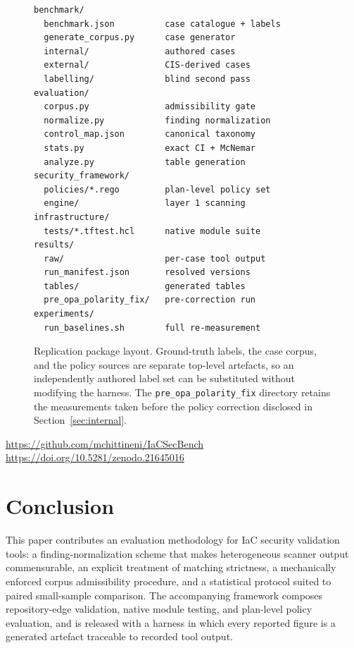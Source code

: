 \documentclass[journal]{IEEEtran}
\begin{document}
\begin{figure}[!t]
\centering
\footnotesize
\begin{verbatim}
benchmark/
  benchmark.json          case catalogue + labels
  generate_corpus.py      case generator
  internal/               authored cases
  external/               CIS-derived cases
  labelling/              blind second pass
evaluation/
  corpus.py               admissibility gate
  normalize.py            finding normalization
  control_map.json        canonical taxonomy
  stats.py                exact CI + McNemar
  analyze.py              table generation
security_framework/
  policies/*.rego         plan-level policy set
  engine/                 layer 1 scanning
infrastructure/
  tests/*.tftest.hcl      native module suite
results/
  raw/                    per-case tool output
  run_manifest.json       resolved versions
  tables/                 generated tables
  pre_opa_polarity_fix/   pre-correction run
experiments/
  run_baselines.sh        full re-measurement
\end{verbatim}
\caption{Replication package layout. Ground-truth labels, the case corpus, and the
policy sources are separate top-level artefacts, so an independently authored
label set can be substituted without modifying the harness. The
\texttt{pre\_opa\_polarity\_fix} directory retains the measurements taken before
the policy correction disclosed in Section~\ref{sec:internal}.}
\label{fig:artifact}
\end{figure}

\begin{center}
\url{https://github.com/mchittineni/IaCSecBench}\\
\url{https://doi.org/10.5281/zenodo.21645016}
\end{center}

\section{Conclusion}
\label{sec:conclusion}

This paper contributes an evaluation methodology for IaC security validation
tools: a finding-normalization scheme that makes heterogeneous scanner output
commensurable, an explicit treatment of matching strictness, a mechanically
enforced corpus admissibility procedure, and a statistical protocol suited to
paired small-sample comparison. The accompanying framework composes
repository-edge validation, native module testing, and plan-level policy
evaluation, and is released with a harness in which every reported figure is a
generated artefact traceable to recorded tool output.
\end{document}
